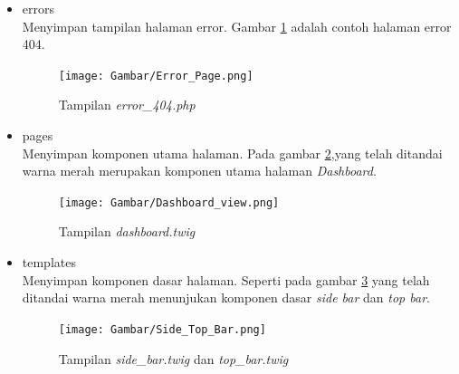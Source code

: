 \begin{itemize}
    \item errors \\
    Menyimpan tampilan halaman error. Gambar \ref{fig:errorpage} adalah contoh halaman error 404.
    \begin{figure}[h!]
     \centering
     \texttt{[image: Gambar/Error\_Page.png]}
     \caption{Tampilan \textit{error\_404.php}}
     \label{fig:errorpage}
     \end{figure}
     
    \item pages\\
    Menyimpan komponen utama halaman. Pada gambar \ref{fig:dashboardview},yang telah ditandai warna merah merupakan komponen utama halaman \textit{Dashboard}.
    
    \begin{figure}[h!]
     \centering
     \texttt{[image: Gambar/Dashboard\_view.png]}
     \caption{Tampilan \textit{dashboard.twig}}
     \label{fig:dashboardview}
     \end{figure}
\newpage
    \item templates\\
    Menyimpan komponen dasar halaman. Seperti pada gambar \ref{fig:sidetopbar} yang telah ditandai warna merah menunjukan komponen dasar \textit{side bar} dan \textit{top bar}.
    
    \begin{figure}[!h]
     \centering
     \texttt{[image: Gambar/Side\_Top\_Bar.png]}
     \caption{Tampilan \textit{side\_bar.twig} dan \textit{top\_bar.twig}}
     \label{fig:sidetopbar}
     \end{figure}
     
\end{itemize}




